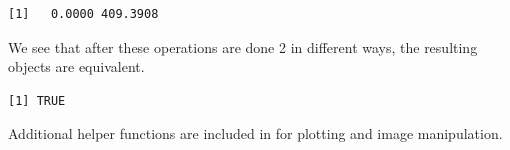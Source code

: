 \begin{knitrout}
\color{fgcolor}\begin{kframe}
\begin{alltt}
 \hlkwb{=} 
\end{alltt}
\begin{verbatim}
[1]   0.0000 409.3908
\end{verbatim}
\end{kframe}
\end{knitrout}
We see that after these operations are done 2 in different ways, the resulting  objects are equivalent.  
\begin{knitrout}
\color{fgcolor}\begin{kframe}
\begin{alltt}
\end{alltt}
\begin{verbatim}
[1] TRUE
\end{verbatim}
\end{kframe}
\end{knitrout}

Additional helper functions are included in  for plotting and image manipulation.








